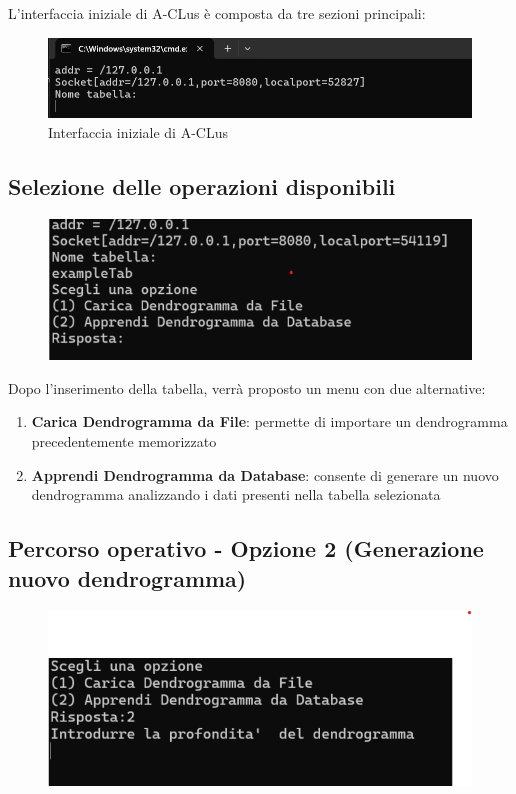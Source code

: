 L'interfaccia iniziale di A-CLus è composta da tre sezioni principali:

\begin{figure}[h!]
    \centering
    \includegraphics[width=\textwidth]{images/client in esecuzione.png}
    \caption{Interfaccia iniziale di A-CLus}
\end{figure}

\subsection{Selezione delle operazioni disponibili}

\begin{figure}[h!]
    \centering
    \includegraphics[width=\textwidth]{images/inserimento_tabella.png}
\end{figure}

Dopo l'inserimento della tabella, verrà proposto un menu con due alternative:
\begin{enumerate}
    \item \textbf{Carica Dendrogramma da File}: permette di importare un dendrogramma precedentemente memorizzato
    \item \textbf{Apprendi Dendrogramma da Database}: consente di generare un nuovo dendrogramma analizzando i dati presenti nella tabella selezionata
\end{enumerate}

\subsection{Percorso operativo - Opzione 2 (Generazione nuovo dendrogramma)}

\begin{figure}[h!]
    \centering
    \includegraphics[width=\textwidth]{images/apprendi_datagramma.png}
\end{figure}

